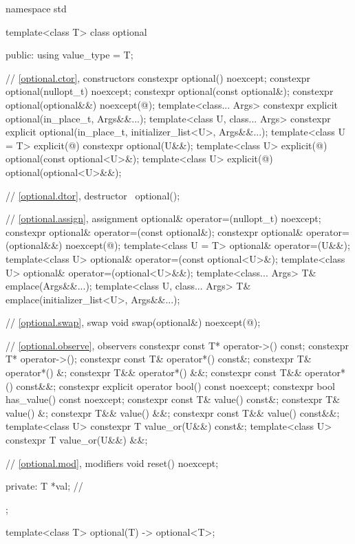 %
%
\begin{codeblock}
namespace std {
  template<class T>
  class optional {
  public:
    using value_type = T;

    // \ref{optional.ctor}, constructors
    constexpr optional() noexcept;
    constexpr optional(nullopt_t) noexcept;
    constexpr optional(const optional&);
    constexpr optional(optional&&) noexcept(@\seebelow@);
    template<class... Args>
      constexpr explicit optional(in_place_t, Args&&...);
    template<class U, class... Args>
      constexpr explicit optional(in_place_t, initializer_list<U>, Args&&...);
    template<class U = T>
      explicit(@\seebelow@) constexpr optional(U&&);
    template<class U>
      explicit(@\seebelow@) optional(const optional<U>&);
    template<class U>
      explicit(@\seebelow@) optional(optional<U>&&);

    // \ref{optional.dtor}, destructor
    ~optional();

    // \ref{optional.assign}, assignment
    optional& operator=(nullopt_t) noexcept;
    constexpr optional& operator=(const optional&);
    constexpr optional& operator=(optional&&) noexcept(@\seebelow@);
    template<class U = T> optional& operator=(U&&);
    template<class U> optional& operator=(const optional<U>&);
    template<class U> optional& operator=(optional<U>&&);
    template<class... Args> T& emplace(Args&&...);
    template<class U, class... Args> T& emplace(initializer_list<U>, Args&&...);

    // \ref{optional.swap}, swap
    void swap(optional&) noexcept(@\seebelow@);

    // \ref{optional.observe}, observers
    constexpr const T* operator->() const;
    constexpr T* operator->();
    constexpr const T& operator*() const&;
    constexpr T& operator*() &;
    constexpr T&& operator*() &&;
    constexpr const T&& operator*() const&&;
    constexpr explicit operator bool() const noexcept;
    constexpr bool has_value() const noexcept;
    constexpr const T& value() const&;
    constexpr T& value() &;
    constexpr T&& value() &&;
    constexpr const T&& value() const&&;
    template<class U> constexpr T value_or(U&&) const&;
    template<class U> constexpr T value_or(U&&) &&;

    // \ref{optional.mod}, modifiers
    void reset() noexcept;

  private:
    T *val;         // \expos
  };

  template<class T>
    optional(T) -> optional<T>;
}
\end{codeblock}

